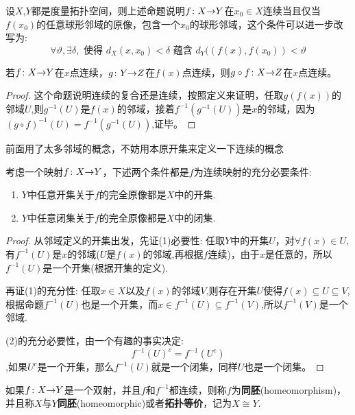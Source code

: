 \begin{example}
设$X$,$Y$都是度量拓扑空间，则上述命题说明${f}\colon{X}{\to}{Y}$在$x_0 \in X$连续当且仅当$f(x_0)$的任意球形邻域的原像，包含一个$x_0$的球形邻域，这个条件可以进一步改写为:\[\forall \vartheta ,\exists \delta,\text{ 使得 } d_X(x,x_0) < \delta \text{ 蕴含 }d_Y((f(x),f(x_0)) < \vartheta\]
\end{example}

\begin{proposition}
若${f}\colon{X}{\to}{Y}$在$x$点连续，${g}\colon{Y}{\to}{Z}$在$f(x)$点连续，则${g \circ f}\colon{X}{\to}{Z}$在$x$点连续。
\end{proposition}

\begin{proof}
这个命题说明连续的复合还是连续，按照定义来证明，任取$g(f(x))$的邻域$U$,则$g^{-1}(U)$是$f(x)$的邻域，接着$f^{-1}(g^{-1}(U))$是$x$的邻域，因为$(g \circ f)^{-1}(U)=f^{-1}(g^{-1}(U))$,证毕。
\end{proof}

前面用了太多邻域的概念，不妨用本原开集来定义一下连续的概念

\begin{theorem}
考虑一个映射${f}\colon{X}{\to}{Y}$，下述两个条件都是$f$为连续映射的充分必要条件:
\begin{enumerate}
	\item $Y$中任意开集关于$f$的完全原像都是$X$中的开集.
	\item $Y$中任意闭集关于$f$的完全原像都是$X$中的闭集.
\end{enumerate}
\end{theorem}

\begin{proof}
从邻域定义的开集出发，先证(1)必要性: 任取$Y$中的开集$U$，对$\forall f(x) \in U$,有$f^{-1}(U)$是$x$的邻域($U$是$f(x)$的邻域,再根据$f$连续)，由于$x$是任意的，所以$f^{-1}(U)$是一个开集(根据开集的定义).

再证(1)的充分性: 任取$x \in X$以及$f(x)$的邻域$V$,则存在开集$U$使得$f(x) \subseteq U \subseteq V$,根据命题$f^{-1}(U)$也是一个开集，而$x \in f^{-1}(U) \subseteq f^{-1}(V)$,所以$f^{-1}(V)$是一个邻域.	

(2)的充分必要性，由一个有趣的事实决定: \[f^{-1}(U)^c  = f^{-1}(U^c)\],如果$U^c$是一个开集，那么$f^{-1}(U)$就是一个闭集，同样$U$也是一个闭集。
\end{proof}

\begin{definition}
如果${f}\colon{X}{\to}{Y}$是一个双射，并且$f$和$f^{-1}$都连续，则称$f$为\textbf{同胚}(homeomorphism)，并且称$X$与$Y$\textbf{同胚}(homeomorphic)或者\textbf{拓扑等价}，记为$X \cong Y$.
\end{definition}

